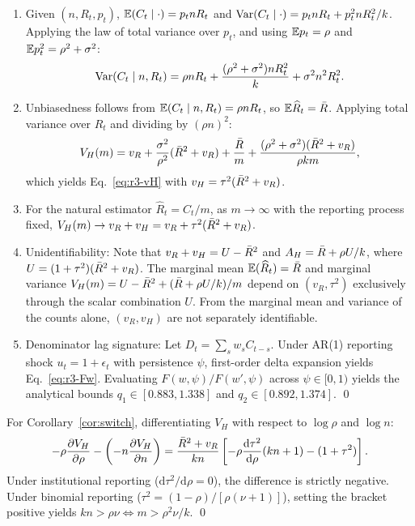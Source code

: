 \begin{enumerate}[label=(\roman*)]
  \item Given $(n, R_t, p_t)$, $\mathbb{E}(C_t \mid \cdot) = p_t n R_t$ and $\mathrm{Var}(C_t \mid \cdot) = p_t n R_t + p_t^2 n R_t^2 / k$. Applying the law of total variance over $p_t$, and using $\mathbb{E} p_t = \rho$ and $\mathbb{E} p_t^2 = \rho^2 + \sigma^2$:
  \begin{equation}
    \mathrm{Var}(C_t \mid n, R_t) = \rho n R_t + \frac{(\rho^2+\sigma^2)nR_t^2}{k} + \sigma^2 n^2 R_t^2.
  \end{equation}
  \item Unbiasedness follows from $\mathbb{E}(C_t \mid n, R_t) = \rho n R_t$, so $\mathbb{E} \widehat{R}_t = \bar{R}$. Applying total variance over $R_t$ and dividing by $(\rho n)^2$:
  \begin{equation}
    V_H(m) = v_R + \frac{\sigma^2}{\rho^2}(\bar{R}^2 + v_R) + \frac{\bar{R}}{m} + \frac{(\rho^2+\sigma^2)(\bar{R}^2+v_R)}{\rho km},
  \end{equation}
  which yields Eq.~\eqref{eq:r3-vH} with $v_H = \tau^2(\bar{R}^2 + v_R)$.
  \item For the natural estimator $\widehat{R}_t = C_t/m$, as $m \to \infty$ with the reporting process fixed, $V_H(m) \to v_R + v_H = v_R + \tau^2(\bar{R}^2 + v_R)$.
  \item Unidentifiability: Note that $v_R + v_H = U - \bar{R}^2$ and $A_H = \bar{R} + \rho U / k$, where $U = (1+\tau^2)(\bar{R}^2+v_R)$. The marginal mean $\mathbb{E}(\widehat{R}_t) = \bar{R}$ and marginal variance $V_H(m) = U - \bar{R}^2 + (\bar{R} + \rho U/k)/m$ depend on $(v_R, \tau^2)$ exclusively through the scalar combination $U$. From the marginal mean and variance of the counts alone, $(v_R, v_H)$ are not separately identifiable.
  \item Denominator lag signature: Let $D_t = \sum_s w_s C_{t-s}$. Under AR(1) reporting shock $u_t = 1 + \epsilon_t$ with persistence $\psi$, first-order delta expansion yields Eq.~\eqref{eq:r3-Fw}. Evaluating $F(w, \psi)/F(w', \psi)$ across $\psi \in [0, 1)$ yields the analytical bounds $q_1 \in [0.883, 1.338]$ and $q_2 \in [0.892, 1.374]$. \qed
\end{enumerate}

For Corollary~\ref{cor:switch}, differentiating $V_H$ with respect to $\log\rho$ and $\log n$:
\begin{equation}
  -\rho\frac{\partial V_H}{\partial \rho} - \left(-n\frac{\partial V_H}{\partial n}\right) = \frac{\bar{R}^2+v_R}{kn}\left[-\rho\frac{\mathrm{d}\tau^2}{\mathrm{d}\rho}(kn+1) - (1+\tau^2)\right].
\end{equation}
Under institutional reporting ($\mathrm{d}\tau^2/\mathrm{d}\rho = 0$), the difference is strictly negative. Under binomial reporting ($\tau^2 = (1-\rho)/[\rho(\nu+1)]$), setting the bracket positive yields $kn > \rho\nu \iff m > \rho^2\nu/k$. \qed

